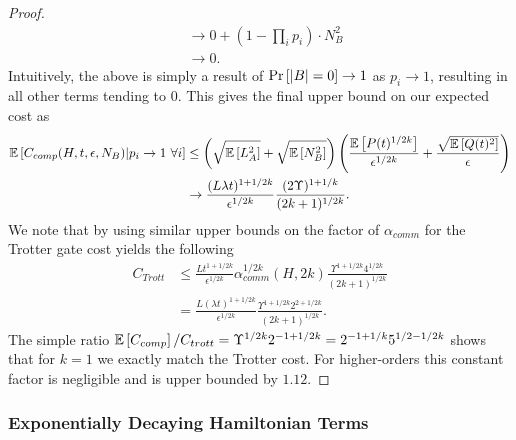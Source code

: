 \begin{proof}
\begin{align}
    &\to 0 + (1 - \prod_i p_i) \cdot N_B^2 \\
    &\to 0.
\end{align}
Intuitively, the above is simply a result of $\text{Pr}\left[ |B| = 0 \right] \to 1$ as $p_i \to 1$, resulting in all other terms tending to 0. This gives the final upper bound on our expected cost as
\begin{align}
    \mathbb{E}\left[ C_{comp}(H, t, \epsilon, N_B) | p_i \to 1 \text{ } \forall i \right] &\leq \left( \sqrt{\mathbb{E}\left[ L_A^2 \right]} + \sqrt{\mathbb{E}\left[ N_B^2 \right]} \right) \left( \frac{\mathbb{E}\left[ P(t)^{1/2k} \right]}{\epsilon^{1/2k}} + \frac{\sqrt{\mathbb{E}\left[ Q(t)^2 \right]}}{\epsilon} \right) \\
    &\to \frac{(L \lambda t)^{1 + 1/2k}}{\epsilon^{1/2k}} \frac{(2 \Upsilon)^{1+1/k}}{(2k+1)^{1/2k}}.
\end{align}
We note that by using similar upper bounds on the factor of $\alpha_{comm}$ for the Trotter gate cost yields the following
\begin{align}
    C_{Trott} &\leq \frac{L t^{1+1/2k}}{\epsilon^{1/2k}} \alpha_{comm}^{1/2k}(H, 2k) \frac{\Upsilon^{1 + 1/2k} 4^{1/2k}}{(2k+1)^{1/2k}} \\
    &= \frac{L (\lambda t)^{1+1/2k}}{\epsilon^{1/2k}} \frac{\Upsilon^{1+1/2k} 2^{2 + 1/2k}}{(2k+1)^{1/2k}}.
\end{align}
The simple ratio $\mathbb{E}\left[ C_{comp} \right] / C_{trott} = \Upsilon^{1/2k} 2^{-1 + 1/2k} = 2^{-1 + 1/k} 5^{1/2 - 1/2k}$ shows that for $k = 1$ we exactly
match the Trotter cost. For higher-orders this constant factor is negligible and is upper bounded by $1.12$. 
\end{proof}


\subsubsection{Exponentially Decaying Hamiltonian Terms}

